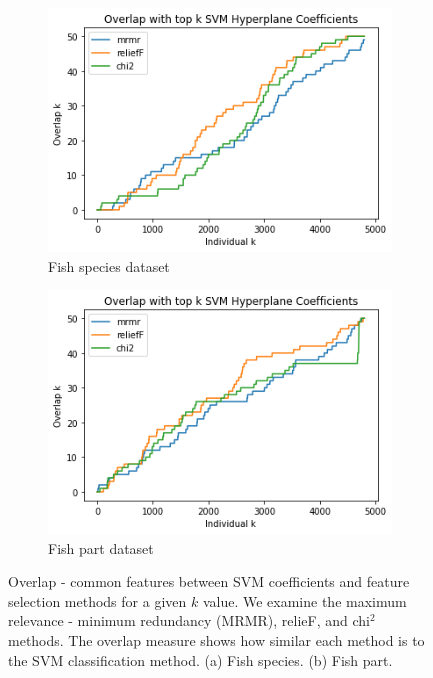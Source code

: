 \documentclass[runningheads]{llncs}
\begin{document}
\begin{figure}[htb]
  \centering
  \begin{subfigure}[b]{\linewidth}
    \includegraphics[width=1\linewidth]{fish_overlap_with_coefficients.png}
    \caption{Fish species dataset}
    \label{fig:fish-hyperplane-overlap}
  \end{subfigure}

  \begin{subfigure}[b]{\linewidth}
    \includegraphics[width=1\linewidth]{part_overlap_with_coefficients.png}
    \caption{Fish part dataset}
    \label{fig:part-hyperplane-overlap}
  \end{subfigure}
  \caption[Two numerical solutions]{
    Overlap - common features between SVM coefficients and feature selection methods for a given $k$ value.
    We examine the maximum relevance - minimum redundancy (MRMR), relieF, and chi$^2$ methods.
    The overlap measure shows how similar each method is to the SVM classification method.
    (a) Fish species. (b) Fish part.}
  \label{hyperplane-overlap}
\end{figure}
\end{document}
